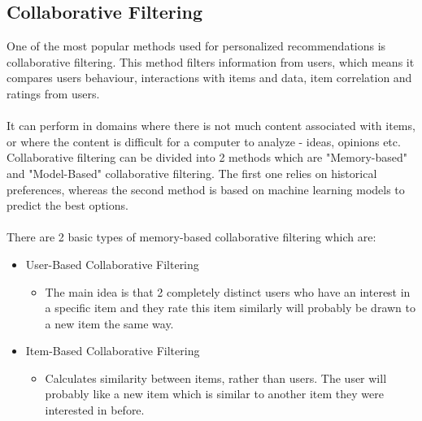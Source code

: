 \documentclass[10pt,oneside,english,a4paper]{article}
\begin{document}
\clearpage
\subsection{Collaborative Filtering}
One of the most popular methods used for personalized recommendations is collaborative filtering. This method filters information from users, which means it compares users behaviour, interactions with items and data, item correlation and ratings from users. \\\\
It can perform in domains where there is not much content associated with items, or
where the content is difficult for a computer to analyze - ideas, opinions etc.\cite{melville:aaai02}\\
Collaborative filtering can be divided into 2 methods which are "Memory-based" and "Model-Based" collaborative filtering. The first one relies on historical preferences, whereas the second method is based on machine learning models to predict the best options.\\\\
There are 2 basic types of memory-based collaborative filtering which are:
\begin{itemize}
\item User-Based Collaborative Filtering
	\begin{itemize}
	\item The main idea is that 2 completely distinct users who have an interest in a specific item and they rate this item similarly will probably be drawn to a new item the same way.
	\end{itemize}
\item Item-Based Collaborative Filtering
	\begin{itemize}
	\item Calculates similarity between items, rather than users. The user will probably like a new item which is similar to another item they were interested in before.\\
	\end{itemize}
\end{itemize}
\end{document}
